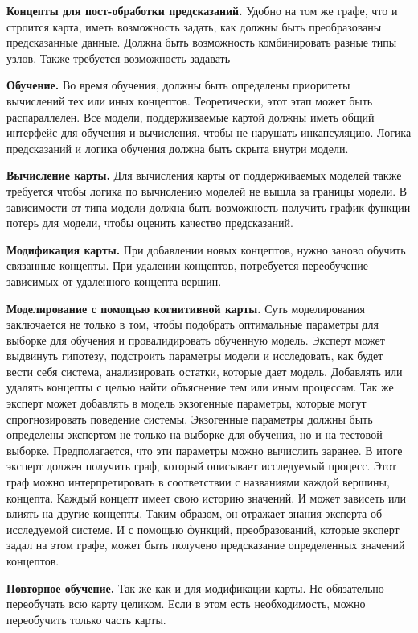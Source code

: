 \textbf{Концепты для пост-обработки предсказаний.}
Удобно на том же графе, что и строится карта,
иметь возможность задать, как должны быть преобразованы
предсказанные данные. Должна быть возможность
комбинировать разные типы узлов. Также требуется возможность
задавать

\textbf{Обучение.}
Во время обучения, должны быть определены приоритеты
вычислений тех или иных концептов.
Теоретически, этот этап может быть распараллелен.
Все модели, поддерживаемые картой должны
иметь общий интерфейс для обучения и вычисления,
чтобы не нарушать инкапсуляцию. Логика предсказаний
и логика обучения должна быть скрыта внутри модели.

\textbf{Вычисление карты.}
Для вычисления карты от поддерживаемых моделей также требуется
чтобы логика по вычислению моделей не вышла за границы модели.
В зависимости от типа модели должна быть возможность получить
график функции потерь для модели, чтобы оценить качество предсказаний.

\textbf{Модификация карты.}
При добавлении новых концептов, нужно заново обучить
связанные концепты. При удалении концептов, потребуется
переобучение зависимых от удаленного концепта вершин.

\textbf{Моделирование с помощью когнитивной карты.}
Суть моделирования заключается не только в том, чтобы подобрать
оптимальные параметры для выборке для обучения и провалидировать обученную модель.
Эксперт может выдвинуть гипотезу, подстроить параметры модели
и исследовать, как будет вести себя система, анализировать
остатки, которые дает модель. Добавлять или удалять концепты с
целью найти объяснение тем или иным процессам. Так же эксперт
может добавлять в модель экзогенные параметры, которые могут
спрогнозировать поведение системы. Экзогенные параметры
должны быть определены экспертом не только на выборке для обучения,
но и на тестовой выборке. Предполагается, что эти параметры можно вычислить заранее.
В итоге эксперт должен получить граф, который описывает
исследуемый процесс. Этот граф можно интерпретировать
в соответствии с названиями каждой вершины, концепта.
Каждый концепт имеет свою историю значений. И может зависеть или
влиять на другие концепты. Таким образом, он отражает знания
эксперта об исследуемой системе. И с помощью функций, преобразований,
которые эксперт задал на этом графе, может быть получено предсказание
определенных значений концептов.

\textbf{Повторное обучение.}
Так же как и для модификации карты. Не обязательно переобучать всю карту целиком.
Если в этом есть необходимость, можно переобучить только часть карты.


